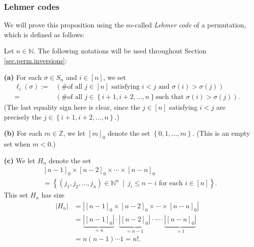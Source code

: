 \subsubsection{Lehmer codes}

We will prove this proposition using the so-called \emph{Lehmer code} of a
permutation, which is defined as follows:

\begin{definition}
\label{def.perm.lehmer1}Let $n\in\mathbb{N}$. The following notations will be
used throughout Section \ref{sec.perm.inversions}: \medskip

\textbf{(a)} For each $\sigma\in S_{n}$ and $i\in\left[  n\right]  $, we set%
\begin{align*}
\ell_{i}\left(  \sigma\right)  :=  &  \left(  \text{\# of all }j\in\left[
n\right]  \text{ satisfying }i<j\text{ and }\sigma\left(  i\right)
>\sigma\left(  j\right)  \right) \\
=  &  \left(  \text{\# of all }j\in\left\{  i+1,i+2,\ldots,n\right\}  \text{
such that }\sigma\left(  i\right)  >\sigma\left(  j\right)  \right)  .
\end{align*}
(The last equality sign here is clear, since the $j\in\left[  n\right]  $
satisfying $i<j$ are precisely the $j\in\left\{  i+1,i+2,\ldots,n\right\}  $.)
\medskip

\textbf{(b)} For each $m\in\mathbb{Z}$, we let $\left[  m\right]  _{0}$ denote
the set $\left\{  0,1,\ldots,m\right\}  $. (This is an empty set when $m<0$.)
\medskip

\textbf{(c)} We let $H_{n}$ denote the set
\begin{align*}
&  \left[  n-1\right]  _{0}\times\left[  n-2\right]  _{0}\times\cdots
\times\left[  n-n\right]  _{0}\\
&  =\left\{  \left(  j_{1},j_{2},\ldots,j_{n}\right)  \in\mathbb{N}^{n}%
\ \mid\ j_{i}\leq n-i\text{ for each }i\in\left[  n\right]  \right\}  .
\end{align*}
This set $H_{n}$ has size%
\begin{align*}
\left\vert H_{n}\right\vert  &  =\left\vert \left[  n-1\right]  _{0}%
\times\left[  n-2\right]  _{0}\times\cdots\times\left[  n-n\right]
_{0}\right\vert \\
&  =\underbrace{\left\vert \left[  n-1\right]  _{0}\right\vert }_{=n}%
\cdot\underbrace{\left\vert \left[  n-2\right]  _{0}\right\vert }_{=n-1}%
\cdot\cdots\cdot\underbrace{\left\vert \left[  n-n\right]  _{0}\right\vert
}_{=1}\\
&  =n\left(  n-1\right)  \cdots1=n!.
\end{align*}



\end{definition}
